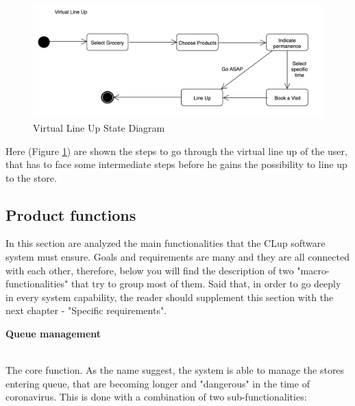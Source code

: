 \documentclass[]{article}
\begin{document}
		\textbf{}\\ \newline
		\textbf{}\\ \newline
		
		\begin{figure}[H]
			\centering
			\includegraphics[width=\linewidth]{virtualqueue.png}
			\caption{Virtual Line Up State Diagram}
			\label{fig:state_diagram3}
		\end{figure}
		
		Here (Figure \ref{fig:state_diagram3})  are shown the steps to go through the virtual line up of the user, that has to face some intermediate steps before he gains the possibility to line up to the store. \\
		

\newpage

\subsection{Product functions}

In this section are analyzed the main functionalities that the CLup software system must ensure. Goals and requirements are many and they are all connected with each other, therefore, below you will find the description of two "macro-functionalities" that try to group most of them. Said that, in order to go deeply in every system capability, the reader should supplement this section with the next chapter - "Specific requirements".
\bigskip
\\
\begin{large}
	\textbf{Queue management}
\end{large}
\smallskip
\\
The core function. As the name suggest, the system is able to manage the stores entering queue, that are becoming longer and "dangerous" in the time of coronavirus. This is done with a combination of two sub-functionalities: 
\end{document}
